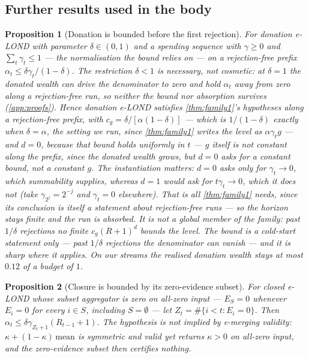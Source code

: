 \documentclass[conference]{IEEEtran}
\newtheorem{proposition}{Proposition}
\newcommand{\alphat}{\alpha_t}
\begin{document}
\subsection{Further results used in the body}\label{app:further}

\begin{proposition}[Donation is bounded before the first rejection]\label{prop:donation}
For donation e-LOND with parameter $\delta\in(0,1)$ and a spending sequence with $\gamma\ge0$ and
$\sum_t\gamma_t\le1$ --- the normalisation the bound relies on --- on a rejection-free prefix
$\alphat\le\delta\gamma_t/(1-\delta)$. The restriction $\delta<1$ is necessary, not cosmetic: at
$\delta=1$ the donated wealth can drive the denominator to zero and hold $\alphat$ away from zero
along a rejection-free run, so neither the bound nor absorption survives (\cref{app:proofs}). Hence donation e-LOND satisfies \cref{thm:family1}'s hypotheses \emph{along a rejection-free prefix},
with $c_g=\delta/[\alpha(1-\delta)]$ --- which is $1/(1-\delta)$ exactly when $\delta=\alpha$, the setting
we run, since \cref{thm:family1} writes the level as $\alpha\gamma_t g$ --- and $d=0$, because
that bound holds uniformly in $t$ --- $g$ itself is not constant along the prefix, since the donated
wealth grows, but $d=0$ asks for a constant bound, not a constant $g$. The instantiation matters: $d=0$ asks only for
$\gamma_t\to0$, which summability supplies, whereas $d=1$ would ask for $t\gamma_t\to0$, which it does
not (take $\gamma_{2^j}=2^{-j}$ and $\gamma_t=0$ elsewhere). That is all \cref{thm:family1} needs, since its conclusion is
itself a statement about rejection-free runs --- so the horizon stays finite and the run is absorbed. It is
\emph{not} a global member of the family: past $1/\delta$ rejections no finite $c_g(R+1)^d$ bounds the
level. The bound is a
cold-start statement only --- past $1/\delta$ rejections the denominator can vanish --- and it is sharp
where it applies. On our streams the realised donation wealth stays at most $0.12$ of a budget of $1$.
\end{proposition}

\begin{proposition}[Closure is bounded by its zero-evidence subset]\label{prop:closure}
For closed e-LOND whose subset aggregator is zero on all-zero input --- $E_S=0$ whenever $E_i=0$ for
every $i\in S$, including $S=\emptyset$ --- let $Z_t=\#\{i<t:E_i=0\}$. Then
$\alphat\le\delta\gamma_{Z_t+1}(R_{t-1}+1)$. The hypothesis is not implied by e-merging validity:
$\kappa+(1-\kappa)\,\mathrm{mean}$ is symmetric and valid yet returns $\kappa>0$ on all-zero input,
and the zero-evidence subset then certifies nothing.
\end{proposition}
\end{document}
